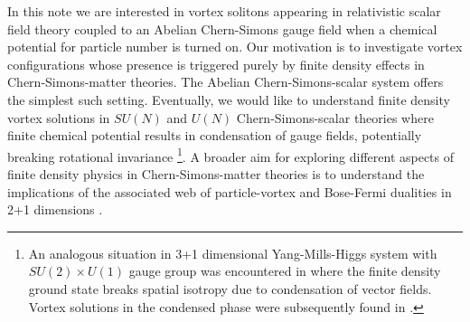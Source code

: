 In this note we are interested in vortex solitons appearing in  relativistic scalar field theory coupled to an Abelian Chern-Simons gauge field when a chemical potential for particle number is turned on. Our motivation is to investigate vortex configurations whose presence is triggered purely by finite density effects in Chern-Simons-matter theories. The Abelian Chern-Simons-scalar system offers the simplest  such setting. Eventually, we would like to understand finite density vortex solutions in $SU(N)$ and $U(N)$ Chern-Simons-scalar theories where  finite chemical potential results in condensation of gauge fields, potentially breaking rotational invariance \cite{Kumar:2018nkf}\footnote{An analogous situation in 3+1 dimensional Yang-Mills-Higgs system with $SU(2)\times U(1)$ gauge group was encountered in \cite{Gusynin:2003yu} where the finite density ground state breaks spatial isotropy due to condensation of vector fields.  Vortex solutions in the condensed phase were subsequently found in \cite{Gorbar:2005pi}.}.
A broader aim for exploring different aspects of finite density physics in Chern-Simons-matter theories is to understand the implications of the associated web \cite{Seiberg:2016gmd, Karch:2016sxi, Murugan:2016zal} of particle-vortex and Bose-Fermi dualities in 2+1 dimensions  
\cite{Giombi:2011kc, Aharony:2011jz, Aharony:2012nh, Aharony:2012ns, Jain:2013py, Jain:2013gza, Takimi:2013zca, Aharony:2015mjs, Geracie:2015drf}.

